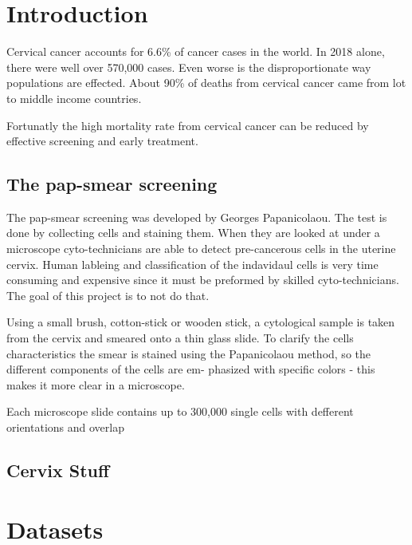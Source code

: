 \documentclass[ms,electronic,oneside,twosidetoc,letterpaper,chaptercenter,parttop]{byumsphd}
\title{\Title}
\author{\Author}
\begin{document}
\maketitle
{}

\chapter{Introduction}

Cervical cancer accounts for 6.6\% of cancer cases in the world. In 2018 alone, there were well
over 570,000 cases. Even worse is the disproportionate way populations are effected. About 90\%
of deaths from cervical cancer came from lot to middle income countries.\cite{15}


Fortunatly the high mortality rate from cervical cancer can be reduced by effective screening and early
treatment.

\section{The pap-smear screening}

The pap-smear screening was developed by Georges Papanicolaou. The test is done by collecting cells and staining them. When they are looked at under a microscope cyto-technicians are able to detect pre-cancerous cells in the uterine
cervix. Human lableing and classification of the indavidaul cells is very time consuming and expensive since it must be preformed by skilled cyto-technicians. The goal of this project is to not do that.

Using a small brush, cotton-stick or wooden stick, a cytological sample is taken from the cervix and smeared onto a thin glass slide. 
To clarify the cells characteristics the smear is stained using the Papanicolaou method, so the different components of the cells are em- phasized with specific colors - this makes it more clear in a microscope.\cite{herlev2}


Each microscope slide contains up to 300,000 single cells with defferent orientations and overlap\cite{herlev2}

\section{Cervix Stuff}


\chapter{Datasets}
\end{document}
